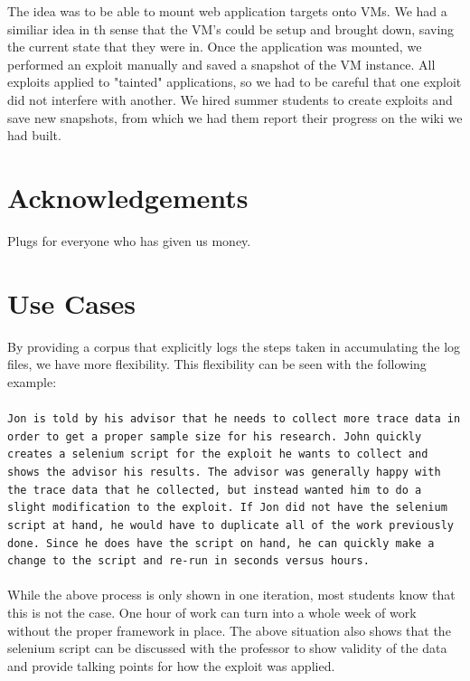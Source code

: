 \documentclass[letterpaper,twocolumn,10pt]{article}
\begin{document}
The idea was to be able to mount web application targets onto VMs.  We had a similiar idea in th sense that the VM's could be setup and brought down, saving the current state that they were in.  Once the application was mounted, we performed an exploit manually and saved a snapshot of the VM instance.  All exploits applied to "tainted" applications, so we had to be careful that one exploit did not interfere with another.  We hired summer students to create exploits and save new snapshots, from which we had them report their progress on the wiki we had built.  


\section{Acknowledgements}

Plugs for everyone who has given us money.

\section{Use Cases}
By providing a corpus that explicitly logs the steps taken in accumulating the log files, we have more flexibility.  This flexibility can be seen with the following example:  
\\\\
{\tt Jon is told by his advisor that he needs to collect more trace data in order to get a proper sample size for his research.  John quickly creates a selenium script for the exploit he wants to collect and shows the advisor his results.  The advisor was generally happy with the trace data that he collected, but instead wanted him to do a slight modification to the exploit.  If Jon did not have the selenium script at hand, he would have to duplicate all of the work previously done.  Since he does have the script on hand, he can quickly make a change to the script and re-run in seconds versus hours.}
\\\\
While the above process is only shown in one iteration, most students know that this is not the case.  One hour of work can turn into a whole week of work without the proper framework in place.  The above situation also shows that the selenium script can be discussed with the professor to show validity of the data and provide talking points for how the exploit was applied.
\end{document}
